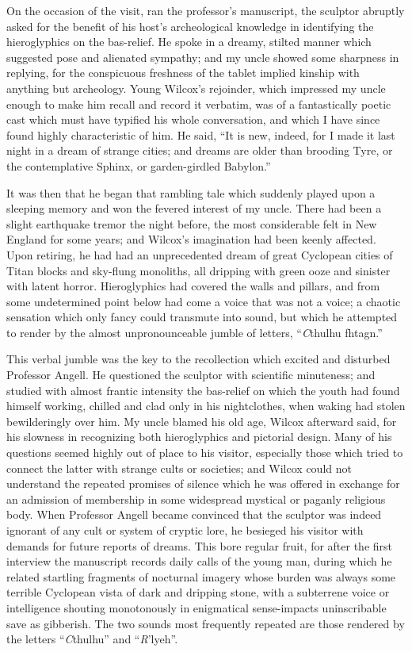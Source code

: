 On the occasion of the visit, ran the professor’s manuscript, the sculptor abruptly asked for the benefit of his host’s archeological knowledge in identifying the hieroglyphics on the bas-relief. He spoke in a dreamy, stilted manner which suggested pose and alienated sympathy; and my uncle showed some sharpness in replying, for the conspicuous freshness of the tablet implied kinship with anything but archeology. Young Wilcox’s rejoinder, which impressed my uncle enough to make him recall and record it verbatim, was of a fantastically poetic cast which must have typified his whole conversation, and which I have since found highly characteristic of him. He said, “It is new, indeed, for I made it last night in a dream of strange cities; and dreams are older than brooding Tyre, or the contemplative Sphinx, or garden-girdled Babylon.”

It was then that he began that rambling tale which suddenly played upon a sleeping memory and won the fevered interest of my uncle. There had been a slight earthquake tremor the night before, the most considerable felt in New England for some years; and Wilcox’s imagination had been keenly affected. Upon retiring, he had had an unprecedented dream of great Cyclopean cities of Titan blocks and sky-flung monoliths, all dripping with green ooze and sinister with latent horror. Hieroglyphics had covered the walls and pillars, and from some undetermined point below had come a voice that was not a voice; a chaotic sensation which only fancy could transmute into sound, but which he attempted to render by the almost unpronounceable jumble of letters, “{\emph Cthulhu fhtagn.}”

This verbal jumble was the key to the recollection which excited and disturbed Professor Angell. He questioned the sculptor with scientific minuteness; and studied with almost frantic intensity the bas-relief on which the youth had found himself working, chilled and clad only in his nightclothes, when waking had stolen bewilderingly over him. My uncle blamed his old age, Wilcox afterward said, for his slowness in recognizing both hieroglyphics and pictorial design. Many of his questions seemed highly out of place to his visitor, especially those which tried to connect the latter with strange cults or societies; and Wilcox could not understand the repeated promises of silence which he was offered in exchange for an admission of membership in some widespread mystical or paganly religious body. When Professor Angell became convinced that the sculptor was indeed ignorant of any cult or system of cryptic lore, he besieged his visitor with demands for future reports of dreams. This bore regular fruit, for after the first interview the manuscript records daily calls of the young man, during which he related startling fragments of nocturnal imagery whose burden was always some terrible Cyclopean vista of dark and dripping stone, with a subterrene voice or intelligence shouting monotonously in enigmatical sense-impacts uninscribable save as gibberish. The two sounds most frequently repeated are those rendered by the letters “{\emph Cthulhu}” and “{\emph R’lyeh}”.

